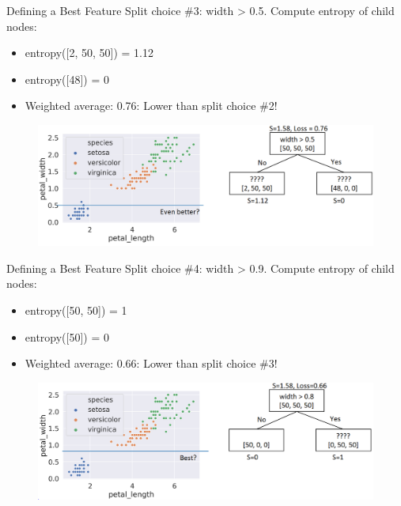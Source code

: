 \documentclass[aspectratio=169]{../latex_main/tntbeamer}  %
\begin{document}
	
	\begin{frame}{Defining a Best Feature}
	    Split choice \#3: width > 0.5. Compute entropy of child nodes:
	    \begin{itemize}
	        \item entropy([2, 50, 50]) = 1.12
	        \item entropy([48]) = 0
	        \item Weighted average: 0.76: Lower than split choice \#2!

	    \end{itemize}
	    
	    \begin{figure}
	        \centering
	        \includegraphics[scale=.4]{Bild50}
	    \end{figure}
	\end{frame}
	
	
	\begin{frame}{Defining a Best Feature}
 	    Split choice \#4: width > 0.9. Compute entropy of child nodes:
	    \begin{itemize}
	        \item entropy([50, 50]) = 1
	        \item entropy([50]) = 0
	        \item Weighted average: 0.66: Lower than split choice \#3!

	    \end{itemize}
	    
	    \begin{figure}
	        \centering
	        \includegraphics[scale=.4]{Bild51}
	    \end{figure}
	\end{frame}
	
\end{document}
